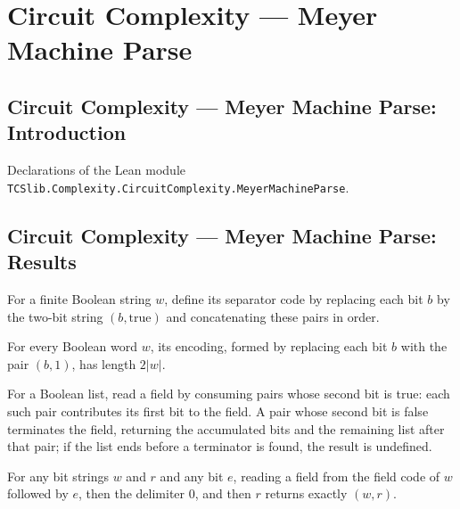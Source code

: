 \section{Circuit Complexity --- Meyer Machine Parse}
\subsection*{Circuit Complexity --- Meyer Machine Parse: Introduction}

Declarations of the Lean module \texttt{TCSlib.Complexity.CircuitComplexity.MeyerMachineParse}.

\subsection*{Circuit Complexity --- Meyer Machine Parse: Results}

\begin{definition}
\label{Complexity.Meyer.fcode}
\leanok
For a finite Boolean string $w$, define its separator code by replacing each bit $b$ by
the two-bit string $(b,\mathrm{true})$ and concatenating these pairs in order.
\end{definition}

\begin{theorem}
\label{Complexity.Meyer.length_fcode}
\leanok
{}
For every Boolean word $w$, its encoding, formed by replacing each bit $b$ with the pair
$(b,1)$, has length $2|w|$.
\end{theorem}

\begin{definition}
\label{Complexity.Meyer.readField}
\leanok
For a Boolean list, read a field by consuming pairs whose second bit is true: each such
pair contributes its first bit to the field. A pair whose second bit is false terminates
the field, returning the accumulated bits and the remaining list after that pair; if the
list ends before a terminator is found, the result is undefined.
\end{definition}

\begin{theorem}
\label{Complexity.Meyer.readField_fcode}
\leanok
{}
For any bit strings $w$ and $r$ and any bit $e$, reading a field from the field code of
$w$ followed by $e$, then the delimiter $0$, and then $r$ returns exactly $(w,r)$.
\end{theorem}

